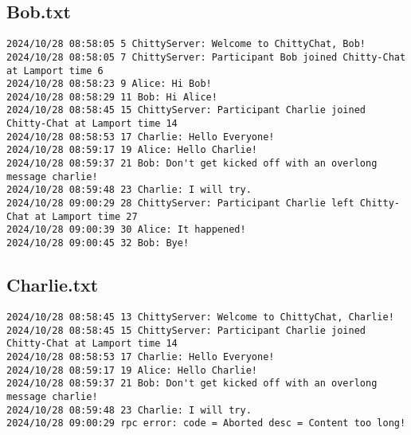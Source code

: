 \documentclass[a4paper,11pt]{article}
\begin{document}
\pagebreak

\subsection{Bob.txt}

\begin{lstlisting}
2024/10/28 08:58:05 5 ChittyServer: Welcome to ChittyChat, Bob!
2024/10/28 08:58:05 7 ChittyServer: Participant Bob joined Chitty-Chat at Lamport time 6
2024/10/28 08:58:23 9 Alice: Hi Bob!
2024/10/28 08:58:29 11 Bob: Hi Alice!
2024/10/28 08:58:45 15 ChittyServer: Participant Charlie joined Chitty-Chat at Lamport time 14
2024/10/28 08:58:53 17 Charlie: Hello Everyone!
2024/10/28 08:59:17 19 Alice: Hello Charlie!
2024/10/28 08:59:37 21 Bob: Don't get kicked off with an overlong message charlie!
2024/10/28 08:59:48 23 Charlie: I will try. 
2024/10/28 09:00:29 28 ChittyServer: Participant Charlie left Chitty-Chat at Lamport time 27
2024/10/28 09:00:39 30 Alice: It happened!
2024/10/28 09:00:45 32 Bob: Bye!    
\end{lstlisting}

\pagebreak

\subsection{Charlie.txt}

\begin{lstlisting}
2024/10/28 08:58:45 13 ChittyServer: Welcome to ChittyChat, Charlie!
2024/10/28 08:58:45 15 ChittyServer: Participant Charlie joined Chitty-Chat at Lamport time 14
2024/10/28 08:58:53 17 Charlie: Hello Everyone!
2024/10/28 08:59:17 19 Alice: Hello Charlie!
2024/10/28 08:59:37 21 Bob: Don't get kicked off with an overlong message charlie!
2024/10/28 08:59:48 23 Charlie: I will try. 
2024/10/28 09:00:29 rpc error: code = Aborted desc = Content too long!
\end{lstlisting}
\end{document}
